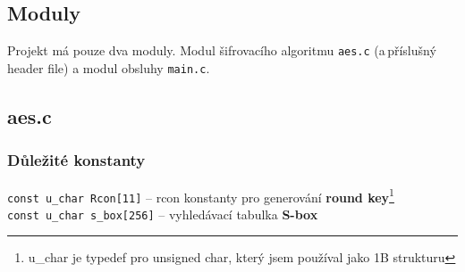 \documentclass[12pt]{article}
\begin{document}
\subsection{Moduly}
Projekt má pouze dva moduly. Modul šifrovacího algoritmu \texttt{aes.c}
(a\,příslušný header file) a modul obsluhy \texttt{main.c}.
\subsection{aes.c}
\subsubsection{Důležité konstanty}
\noindent\texttt{const u\_char Rcon[11]} -- rcon konstanty pro generování
\textbf{round key}\footnote{u\_char je typedef pro unsigned char, který
	jsem používal jako 1B strukturu}\\
\texttt{const u\_char s\_box[256]} -- vyhledávací tabulka \textbf{S-box}
\end{document}
